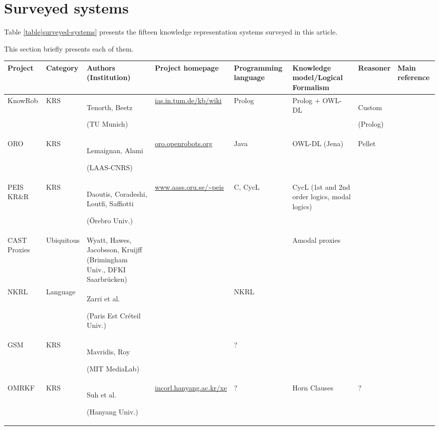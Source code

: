 \documentclass[a4paper, twocolumn]{article}
\begin{document}
\section{Surveyed systems}
\label{sect|surveyed-systems}

Table \ref{table|surveyed-systems} presents the fifteen knowledge representation systems surveyed
in this article.

This section briefly presents each of them.

\begin{landscape}
\begin{table}\footnotesize
\begin{center}

\begin{tabular}{p{2.2cm}p{1.6cm}p{4cm}lp{2.4cm}p{3.4cm}p{2.8cm}p{1.5cm}}
\toprule
{\bf Project} & {\bf Category} & {\bf Authors (Institution)} & {\bf Project homepage} & {\bf Programming language} & {\bf Knowledge model/Logical Formalism} & {\bf Reasoner} & Main reference \\
\midrule
{\sc KnowRob} & KRS & Tenorth, Beetz \par (TU Munich) & \url{ias.in.tum.de/kb/wiki} & {\sc Prolog} & {\sc Prolog} + OWL-DL & Custom \par ({\sc Prolog}) & \cite{Tenorth2009a} \\
ORO & KRS & Lemaignan, Alami \par (LAAS-CNRS) & \url{oro.openrobots.org} & {\sc Java} & OWL-DL ({\sc Jena}) & {\sc Pellet} & \cite{Lemaignan2010} \\
PEIS KR\&R & KRS & Daoutis, Coradeshi, Loutfi, Saffiotti \par (Örebro Univ.) & \url{www.aass.oru.se/~peis} & {\sc C}, {\sc CycL} & CycL (1st and 2nd order logics, modal logics) & & \cite{Daoutis2009} \\
CAST Proxies & Ubiquitous & Wyatt, Hawes, Jacobsson, Kruijff (Brimingham Univ., DFKI Saarbrücken) & & & Amodal proxies & & \cite{Jacobsson2008} \\
NKRL & Language & Zarri et al. \par (Paris Est Créteil Univ.) & & NKRL & & & \cite{Sabri2011} \\
GSM & KRS & Mavridis, Roy \par (MIT MediaLab) & & ? & & & \cite{Mavridis2006} \\
OMRKF & KRS & Suh et al. \par (Hanyang Univ.) & \url{incorl.hanyang.ac.kr/xe} & ? & Horn Clauses & ? & \cite{Suh2007} \\

\end{tabular}
\end{center}
\end{table}
\end{landscape}
\end{document}
